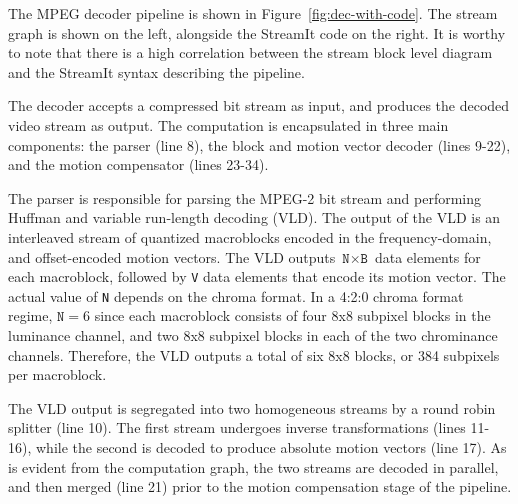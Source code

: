 \begin{figure*}[t]
  \centerline{}
  \caption{MPEG-2 decoder block diagram and corresponding StreamIt code.}
  \label{fig:dec-with-code}
\end{figure*}


The MPEG decoder pipeline is shown in
Figure~\ref{fig:dec-with-code}. The stream graph is shown on the left,
alongside the StreamIt code on the right. It is worthy to note that
there is a high correlation between the stream block level diagram and
the StreamIt syntax describing the pipeline.

The decoder accepts a compressed bit stream as input, and produces the
decoded video stream as output. The computation is encapsulated in
three main components: the parser (line 8), the block and motion vector
decoder (lines 9-22), and the motion compensator (lines 23-34).

The parser is responsible for parsing the MPEG-2 bit stream and
performing Huffman and variable run-length decoding (VLD). The output
of the VLD is an interleaved stream of quantized macroblocks encoded
in the frequency-domain, and offset-encoded motion vectors. The VLD
outputs $\texttt{N}\times\texttt{B}$ data elements for each
macroblock, followed by \texttt{V} data elements that encode its
motion vector. The actual value of \texttt{N} depends on the chroma
format. In a 4:2:0 chroma format regime, $\texttt{N}=6$ since each
macroblock consists of four 8x8 subpixel blocks in the luminance channel,
and two 8x8 subpixel blocks in each of the two chrominance
channels. Therefore, the VLD outputs a total of six 8x8 blocks,
or 384 subpixels per macroblock.

The VLD output is segregated into two homogeneous streams by a
round robin splitter (line 10). The first stream undergoes inverse
transformations (lines 11-16), while the second is decoded to produce
absolute motion vectors (line 17). As is evident from the computation
graph, the two streams are decoded in parallel, and then merged (line
21) prior to the motion compensation stage of the pipeline.


